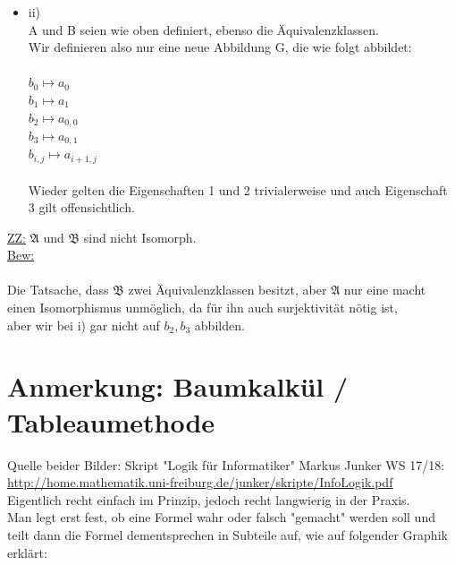 \documentclass[a4paper]{scrartcl}
\begin{document}
\begin{itemize}
\begin{itemize}
            \item ii)\\
                A und B seien wie oben definiert, ebenso die Äquivalenzklassen.\\
                Wir definieren also nur eine neue Abbildung G, die wie folgt abbildet:\\
                \\$b_0 \mapsto a_0$\\
                $b_1 \mapsto a_1$\\
                $b_2 \mapsto a_{0,0}$\\
                $b_3 \mapsto a_{0,1}$\\
                $b_{i,j} \mapsto a_{i+1,j}$\\
                \\Wieder gelten die Eigenschaften 1 und 2 trivialerweise und auch Eigenschaft 3 gilt offensichtlich.\\



        \end{itemize}

        \underline{ZZ:} $\mathfrak{A}$ und $\mathfrak{B}$ sind nicht Isomorph.\\
        \underline{Bew:}\\
        \\Die Tatsache, dass $\mathfrak{B}$ zwei Äquivalenzklassen besitzt, aber $\mathfrak{A}$ nur eine macht einen Isomorphismus unmöglich,
        da für ihn auch surjektivität nötig ist,\\
        aber wir bei i) gar nicht auf $b_2, b_3$ abbilden.

\end{itemize}

\newpage

\section*{Anmerkung: Baumkalkül / Tableaumethode}%
\label{sec:anmerkung_baumkalkul_tableaumethode}
    Quelle beider Bilder: Skript "Logik für Informatiker" Markus Junker WS 17/18:\\
    \url{http://home.mathematik.uni-freiburg.de/junker/skripte/InfoLogik.pdf}\\

    Eigentlich recht einfach im Prinzip, jedoch recht langwierig in der Praxis.\\
    Man legt erst fest, ob eine Formel wahr oder falsch "gemacht" werden soll und teilt dann die Formel dementsprechen in Subteile auf, wie auf folgender Graphik erklärt:
\end{document}

